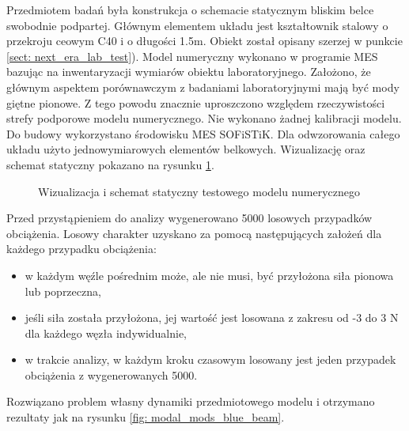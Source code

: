 Przedmiotem badań była konstrukcja o schemacie statycznym bliskim belce swobodnie podpartej. Głównym elementem układu jest kształtownik stalowy o przekroju ceowym C40 i o długości 1.5m. Obiekt został opisany szerzej w punkcie \ref{sect: next_era_lab_test}).  Model numeryczny wykonano w programie MES bazując na inwentaryzacji wymiarów obiektu laboratoryjnego. Założono, że głównym aspektem porównawczym z badaniami laboratoryjnymi mają być mody giętne pionowe. Z tego powodu znacznie uproszczono względem rzeczywistości strefy podporowe modelu numerycznego. Nie wykonano żadnej kalibracji modelu. Do budowy wykorzystano środowisku MES SOFiSTiK. Dla odwzorowania całego układu użyto jednowymiarowych elementów belkowych. Wizualizację oraz schemat statyczny pokazano na rysunku \ref{fig: test_beam_wis_model}.
\begin{figure}[hbt!]
	\centering
	\captionsetup{justification=centering}
	\caption{Wizualizacja i schemat statyczny testowego modelu numerycznego}
	\label{fig: test_beam_wis_model}
\end{figure}

Przed przystąpieniem do analizy wygenerowano 5000 losowych przypadków obciążenia. Losowy charakter uzyskano za pomocą następujących założeń dla każdego przypadku obciążenia:
\begin{itemize}
	\item w każdym węźle pośrednim może, ale nie musi, być przyłożona siła pionowa lub poprzeczna,
	\item jeśli siła została przyłożona, jej wartość jest losowana z zakresu od -3 do 3 N dla każdego węzła indywidualnie,
	\item w trakcie analizy, w każdym kroku czasowym losowany jest jeden przypadek obciążenia z wygenerowanych 5000.
\end{itemize}
Rozwiązano problem własny dynamiki przedmiotowego modelu i otrzymano rezultaty jak na rysunku \ref{fig: modal_mods_blue_beam}.

